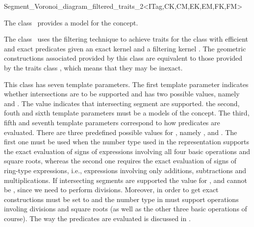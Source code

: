 


\begin{ccRefClass}
{Segment_Voronoi_diagram_filtered_traits_2<ITag,CK,CM,EK,EM,FK,FM>}


\ccDefinition
  
The class \ccRefName\ provides a model for the
 concept.

The class \ccRefName\ uses the filtering technique \cite{bbp-iayed-01}
to achieve traits for the 
class with efficient and exact predicates given an exact
kernel  and a filtering kernel . The geometric
constructions associated provided by this class are equivalent
to those provided by the traits class
, which means that
they may be inexact.

This class has seven template parameters. The first template parameter
indicates whether intersections are to be supported and has two
possible values, namely  and
. The value  indicates that
intersecting segment are supported. the second, fouth and sixth
template parameters must be a models of the  concept. The
third, fifth and seventh template parameters correspond to how
predicates are evaluated. There are three predefined possible values for
, namely ,
 and . The first one must be
used when the number type used in the representation supports the
exact evaluation of signs of expressions involving all four basic
operations and square roots, whereas the second one requires the exact
evaluation of signs of ring-type expressions, i.e., expressions
involving only additions, subtractions and multiplications. If
intersecting segments are supported the value for , 
and  cannot be , since we need to perform
divisions. Moreover, in order to get exact constructions 
must be set to  and the number type in
 must support operations involing divisions and square roots
(as well as the other three basic operations of course).
%
The way the predicates are evaluated is discussed in
\cite{b-ecvdl-96,k-peasv-04}.


\end{ccRefClass}
